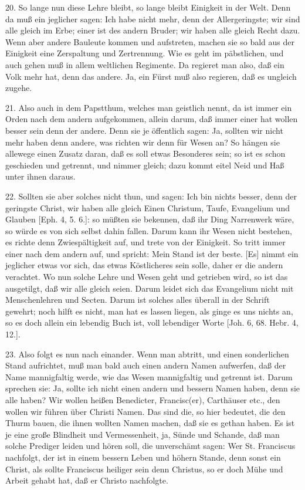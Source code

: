 20. So lange nun diese Lehre bleibt, so lange bleibt Einigkeit in der Welt. Denn da muß ein jeglicher sagen: Ich habe nicht mehr, denn der Allergeringste; wir sind alle gleich im Erbe; einer ist des andern Bruder; wir haben alle gleich Recht dazu. Wenn aber andere Bauleute kommen und aufstreten, machen sie so bald aus der Einigkeit eine Zerspaltung und Zertrennung. Wie es geht im päbstlichen, und auch gehen muß in allem weltlichen Regimente. Da regieret man also, daß ein Volk mehr hat, denn das andere. Ja, ein Fürst muß also regieren, daß es ungleich zugehe.

21. Also auch in dem Papstthum, welches man geistlich nennt, da ist immer ein Orden nach dem andern aufgekommen, allein darum, daß immer einer hat wollen besser sein denn der andere. Denn sie je öffentlich sagen: Ja, sollten wir nicht mehr haben denn andere, was richten wir denn für Wesen an? So hängen sie allewege einen Zusatz daran, daß es soll etwas Besonderes sein; so ist es schon geschieden und getrennt, und nimmer gleich; dazu kommt eitel Neid und Haß unter ihnen daraus.

22. Sollten sie aber solches nicht thun, und sagen: Ich bin nichts besser, denn der geringste
Christ, wir haben alle gleich Einen Christum, Taufe, Evangelium und Glauben [Eph. 4, 5. 6.]: so müßten sie bekennen, daß ihr Ding Narrenwerk wäre, so würde es von sich selbst dahin fallen. Darum kann ihr Wesen nicht bestehen, es richte denn Zwiespältigkeit auf, und trete von der Einigkeit. So tritt immer einer nach dem andern auf, und spricht: Mein Stand ist der beste. [Es] nimmt ein jeglicher etwas vor sich, das etwas Köstlicheres sein solle, daher er die andern verachtet. Wo nun solche Lehre und Wesen geht und getrieben wird, so ist das ausgetilgt, daß wir alle gleich seien. Darum leidet sich das Evangelium nicht mit Menschenlehren und Secten. Darum ist solches alles überall in der Schrift gewehrt; noch hilft es nicht, man hat es lassen liegen, als ginge es uns nichts an, so es doch allein ein lebendig Buch ist, voll lebendiger Worte [Joh. 6, 68. Hebr. 4, 12.].

23. Also folgt es nun nach einander. Wenn man abtritt, und einen sonderlichen Stand aufrichtet, muß man bald auch einen andern Namen aufwerfen, daß der Name mannigfaltig werde, wie das Wesen mannigfaltig und getrennt ist. Darum sprechen sie: Ja, sollte ich nicht einen andern und bessern Namen haben, denn sie alle haben? Wir wollen heißen Benedicter, Francisc(er), Carthäuser etc., den wollen wir führen über Christi Namen. Das sind die, so hier bedeutet, die den Thurm bauen, die ihnen wollten Namen machen, daß sie es gethan haben. Es ist je eine große Blindheit und Vermessenheit, ja, Sünde und Schande, daß man solche Prediger leiden und hören soll, die unverschämt sagen: Wer St. Franciscus nachfolgt, der ist in einem bessern Leben und höhern Stande, denn sonst ein Christ, als sollte Franciscus heiliger sein denn Christus, so er doch Mühe und Arbeit gehabt hat, daß er Christo nachfolgte.

